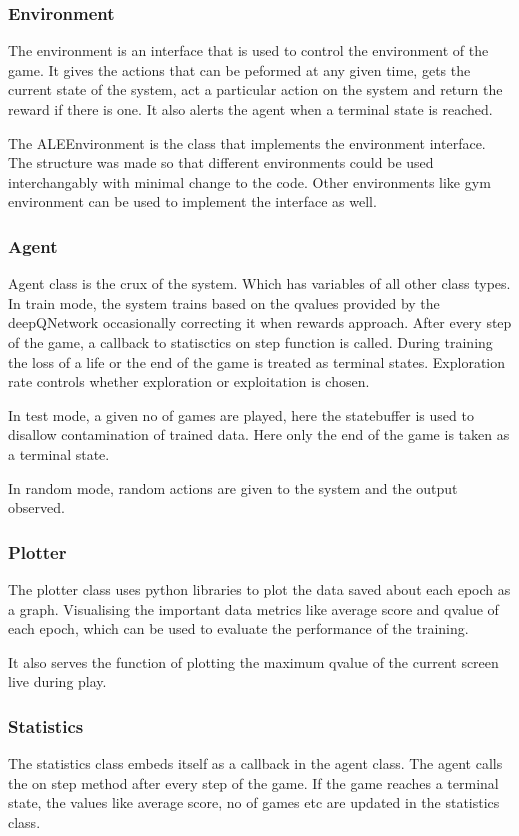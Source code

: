 \documentclass[a4paper,11pt]{article}
\begin{document}
			\subsubsection{Environment}
				The environment is an interface that is used to control the environment of the game. It gives the actions that can be peformed at any given time, gets the current state of the system, act a particular action on the system and return the reward if there is one. It also alerts the agent when a terminal state is reached.

				The ALEEnvironment is the class that implements the environment interface. The structure was made so that different environments could be used interchangably with minimal change to the code. Other environments like gym environment can be used to implement the interface as well.

			\subsubsection{Agent}
				Agent class is the crux of the system. Which has variables of all other class types. In train mode, the system trains based on the qvalues provided by the deepQNetwork occasionally correcting it when rewards approach. After every step of the game, a callback to statisctics on step function is called. During training the loss of a life or the end of the game is treated as terminal states. Exploration rate controls whether exploration or exploitation is chosen. 

				In test mode, a given no of games are played, here the statebuffer is used to disallow contamination of trained data. Here only the end of the game is taken as a terminal state.

				In random mode, random actions are given to the system and the output observed.

			\subsubsection{Plotter}
				The plotter class uses python libraries to plot the data saved about each epoch as a graph. Visualising the important data metrics like average score and qvalue of each epoch, which can be used to evaluate the performance of the training.

				It also serves the function of plotting the maximum qvalue of the current screen live during play.
			
			\subsubsection{Statistics}
				The statistics class embeds itself as a callback in the agent class. The agent calls the on step method after every step of the game. If the game reaches a terminal state, the values like average score, no of games etc are updated in the statistics class.
\end{document}
